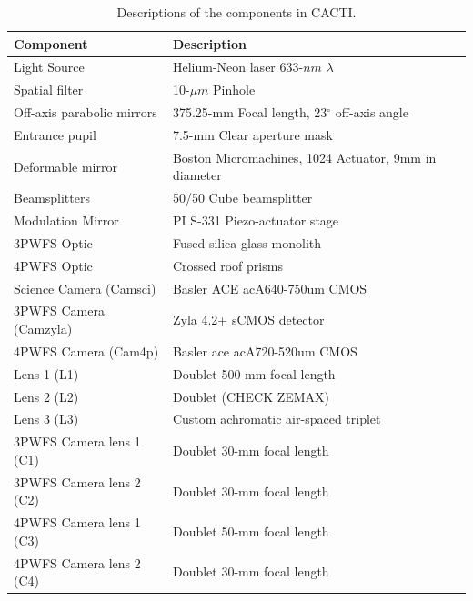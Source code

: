 \begin{table}
	\begin{center}
		\begin{tabular}{ | l| l | }
			\hline
			\textbf{Component}& \textbf{Description}\\ \hline
			Light Source & Helium-Neon laser 633-$nm$ $\lambda$\\ \hline
			Spatial filter & 10-$\mu m$ Pinhole \\ \hline
			Off-axis parabolic mirrors & 375.25-mm Focal length, 23$^{\circ}$ off-axis angle \\ \hline
            Entrance pupil & 7.5-mm Clear aperture mask \\ \hline
            Deformable mirror & Boston Micromachines, 1024 Actuator, 9mm in diameter \\ \hline
            Beamsplitters & 50/50 Cube beamsplitter \\ \hline
            Modulation Mirror &  PI S-331 Piezo-actuator stage \\ \hline
            3PWFS Optic & Fused silica glass monolith \\ \hline
            4PWFS Optic & Crossed roof prisms \\ \hline
            Science Camera (Camsci) & Basler ACE acA640-750um CMOS\\ \hline
            3PWFS Camera (Camzyla) & Zyla 4.2+ sCMOS detector \\ \hline
            4PWFS Camera (Cam4p) & Basler ace acA720-520um CMOS \\ \hline
            Lens 1 (L1) & Doublet 500-mm focal length  \\ \hline
            Lens 2 (L2) & Doublet (CHECK ZEMAX)  \\ \hline
            Lens 3 (L3) & Custom achromatic air-spaced triplet  \\ \hline
            3PWFS Camera lens 1 (C1) & Doublet 30-mm focal length \\ \hline
            3PWFS Camera lens 2 (C2) & Doublet 30-mm focal length \\ \hline
            4PWFS Camera lens 1 (C3) & Doublet 50-mm focal length \\ \hline
            4PWFS Camera lens 2 (C4) & Doublet 30-mm focal length \\ \hline
				
			\end{tabular}
		\end{center}
	\caption{Descriptions of the components in CACTI.}
	\label{tab:CACTItable}
\end{table}

